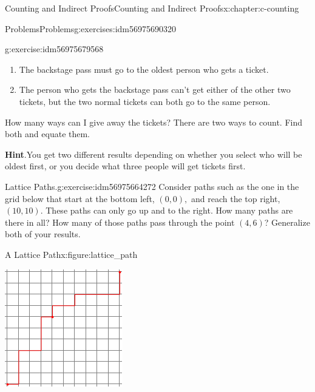 \documentclass[twoside,10pt,]{book}
\newcommand{\blocktitlefont}{\relax}
\numberwithin{equation}{section}
\begin{document}
\begin{chapterptx}{Counting and Indirect Proofs}{}{Counting and Indirect Proofs}{}{}{x:chapter:c-counting}
\begin{exercises-section}{Problems}{}{Problems}{}{}{g:exercises:idm56975690320}
\begin{divisionexercise}{2}{}{}{g:exercise:idm56975679568}
\begin{enumerate}[label=(\alph*)]
\item{}The backstage pass must go to the oldest person who gets a ticket.%
\item{}The person who gets the backstage pass can't get either of the other two tickets, but the two normal tickets can both go to the same person.%
\end{enumerate}
How many ways can I give away the tickets? There are two ways to count. Find both and equate them.%
\par\smallskip%
\noindent\textbf{\blocktitlefont Hint}.\hypertarget{g:hint:idm56975665504}{}\quad{}You get two different results depending on whether you select who will be oldest first, or you decide what three people will get tickets first.%
\end{divisionexercise}%
\begin{divisionexercise}{3}{Lattice Paths.}{}{g:exercise:idm56975664272}%
%
Consider paths such as the one in the grid below that start at the bottom left, \((0,0),\) and reach the top right, \((10,10)\).  These paths can only go up and to the right.  How many paths are there in all? How many of those paths pass through the point \((4,6)\)?  Generalize both of your results.%
\begin{figureptx}{A Lattice Path}{x:figure:lattice_path}{}%
\begin{image}{0.2}{0.6}{0.2}%
\includegraphics[width=\linewidth]{images/lattice_path.png}

\end{image}
\end{figureptx}
\end{divisionexercise}
\end{exercises-section}
\end{chapterptx}
\end{document}
